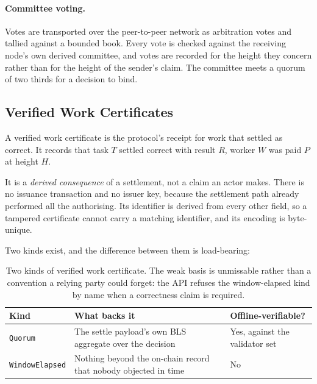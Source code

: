 \documentclass{article}
\begin{document}
\paragraph{Committee voting.} Votes are transported over the peer-to-peer
network as arbitration votes and tallied against a bounded book. Every vote is
checked against the receiving node's own derived committee, and votes are
recorded for the height they concern rather than for the height of the
sender's claim. The committee meets a quorum of two thirds for a decision to
bind.

\subsection{Verified Work Certificates}
\label{sec:vwc}

A verified work certificate is the protocol's receipt for work that settled
as correct. It records that task $T$ settled correct with result $R$, worker
$W$ was paid $P$ at height $H$.

It is a \emph{derived consequence} of a settlement, not a claim an actor
makes. There is no issuance transaction and no issuer key, because the
settlement path already performed all the authorising. Its identifier is
derived from every other field, so a tampered certificate cannot carry a
matching identifier, and its encoding is byte-unique.

Two kinds exist, and the difference between them is load-bearing:

\begin{table}[t]
\centering
\begin{tabular}{@{}p{}p{}p{}@{}}
\toprule
\textbf{Kind} & \textbf{What backs it} & \textbf{Offline-verifiable?} \\
\midrule
\texttt{Quorum} & The settle payload's own BLS aggregate over the decision &
  Yes, against the validator set \\
\texttt{WindowElapsed} & Nothing beyond the on-chain record that nobody
  objected in time & No \\
\bottomrule
\end{tabular}
\caption{Two kinds of verified work certificate. The weak basis is unmissable
rather than a convention a relying party could forget: the API refuses the
window-elapsed kind by name when a correctness claim is required.}
\label{tab:vwc}
\end{table}
\end{document}
